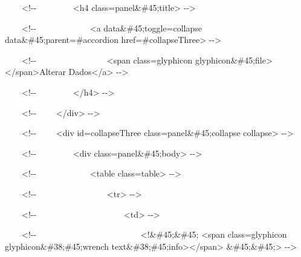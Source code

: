 {\ttfamily\color[rgb]{0.10980392,0.10980392,0.10980392}
    \ \ \ \ {\textless}!-{}- \ \ \ \ \ \ \ \ {\textless}h4
        class={\textquotedbl}panel\&\#45;title{\textquotedbl}{\textgreater} -{}-{\textgreater}}

{\ttfamily\color[rgb]{0.10980392,0.10980392,0.10980392}
    \ \ \ \ {\textless}!-{}- \ \ \ \ \ \ \ \ \ \ \ \ {\textless}a data\&\#45;toggle={\textquotedbl}collapse{\textquotedbl}
    data\&\#45;parent={\textquotedbl}\#accordion{\textquotedbl}
    href={\textquotedbl}\#collapseThree{\textquotedbl}{\textgreater} -{}-{\textgreater}}

{\ttfamily\color[rgb]{0.10980392,0.10980392,0.10980392}
    \ \ \ \ {\textless}!-{}- \ \ \ \ \ \ \ \ \ \ \ \ \ \ \ \ {\textless}span class={\textquotedbl}glyphicon
        glyphicon\&\#45;file{\textquotedbl}{\textgreater} {\textless}/span{\textgreater}Alterar
        Dados{\textless}/a{\textgreater} -{}-{\textgreater}}

{\ttfamily\color[rgb]{0.10980392,0.10980392,0.10980392}
    \ \ \ \ {\textless}!-{}- \ \ \ \ \ \ \ \ {\textless}/h4{\textgreater} -{}-{\textgreater}}

{\ttfamily\color[rgb]{0.10980392,0.10980392,0.10980392}
    \ \ \ \ {\textless}!-{}- \ \ \ \ {\textless}/div{\textgreater} -{}-{\textgreater}}

{\ttfamily\color[rgb]{0.10980392,0.10980392,0.10980392}
    \ \ \ \ {\textless}!-{}- \ \ \ \ {\textless}div id={\textquotedbl}collapseThree{\textquotedbl}
    class={\textquotedbl}panel\&\#45;collapse collapse{\textquotedbl}{\textgreater} -{}-{\textgreater}}

{\ttfamily\color[rgb]{0.10980392,0.10980392,0.10980392}
    \ \ \ \ {\textless}!-{}- \ \ \ \ \ \ \ \ {\textless}div
        class={\textquotedbl}panel\&\#45;body{\textquotedbl}{\textgreater} -{}-{\textgreater}}

{\ttfamily\color[rgb]{0.10980392,0.10980392,0.10980392}
    \ \ \ \ {\textless}!-{}- \ \ \ \ \ \ \ \ \ \ \ \ {\textless}table
        class={\textquotedbl}table{\textquotedbl}{\textgreater} -{}-{\textgreater}}

{\ttfamily\color[rgb]{0.10980392,0.10980392,0.10980392}
    \ \ \ \ {\textless}!-{}- \ \ \ \ \ \ \ \ \ \ \ \ \ \ \ \ {\textless}tr{\textgreater} -{}-{\textgreater}}

{\ttfamily\color[rgb]{0.10980392,0.10980392,0.10980392}
    \ \ \ \ {\textless}!-{}- \ \ \ \ \ \ \ \ \ \ \ \ \ \ \ \ \ \ \ \ {\textless}td{\textgreater} -{}-{\textgreater}}

{\ttfamily\color[rgb]{0.10980392,0.10980392,0.10980392}
    \ \ \ \ {\textless}!-{}- \ \ \ \ \ \ \ \ \ \ \ \ \ \ \ \ \ \ \ \ \ \ \ \ {\textless}!\&\#45;\&\#45; {\textless}span
        class={\textquotedbl}glyphicon glyphicon\&\#38;\#45;wrench
        text\&\#38;\#45;info{\textquotedbl}{\textgreater}{\textless}/span{\textgreater} \&\#45;\&\#45;{\textgreater}
    -{}-{\textgreater}}

